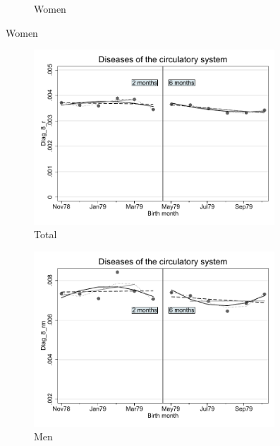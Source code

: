 \documentclass[a4paper ]{article}
\begin{document}
\begin{figure}[h!]
\begin{subfigure}[t]{0.31\textwidth}
		\caption{Women}
	\end{subfigure}
\end{figure}
\newpage
\begin{figure}[h]
	\centering
	\begin{subfigure}[t]{0.31\textwidth}
		\centering
		\includegraphics[width=0.99\textwidth]{R1_RD_Diag_8_r_fits}
		\caption{Total}		
	\end{subfigure}
	\begin{subfigure}[t]{0.31\textwidth}
		\centering
		\includegraphics[width=0.99\textwidth]{R1_RD_Diag_8_rm_fits}
		\caption{Men}		
	\end{subfigure}
	\quad
	\begin{subfigure}[t]{0.31\textwidth}

\end{subfigure}
\end{figure}
\end{document}
